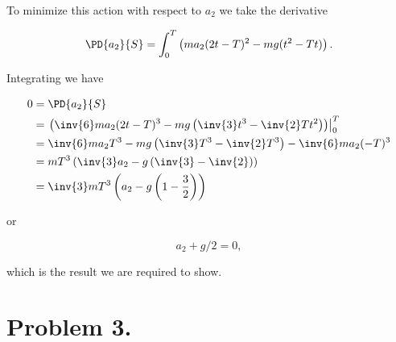 To minimize this action with respect to $a_2$ we take the derivative

\begin{equation}\label{eqn:classicalMechanicsPs1:n}
\PD{a_2}{S} = \int_0^T
\left( 
m a_2 (2 t - T )^2 - m g (t^2 - T t)
\right).
\end{equation}

Integrating we have

\begin{align*}
0 &= \PD{a_2}{S} \\
&={\left.
\left(
\inv{6} m a_2 (2 t - T )^3 - m g \left(\inv{3}t^3 - \inv{2}T t^2 \right)
\right)\right\vert}_0^T \\
&=
\inv{6} m a_2 T^3 - m g \left(\inv{3}T^3 - \inv{2}T^3 \right)
-
\inv{6} m a_2 (- T )^3 \\
&=
m T^3 \left( \inv{3} a_2 - g \left( \inv{3} - \inv{2} \right) \right) \\
&=
\inv{3} m T^3 \left( a_2 - g \left( 1 - \frac{3}{2} \right) \right) \\
\end{align*}

or

\begin{equation}\label{eqn:classicalMechanicsPs1:n}
a_2 + g/2 = 0,
\end{equation}

which is the result we are required to show.

\section{Problem 3.}

\EndArticle
